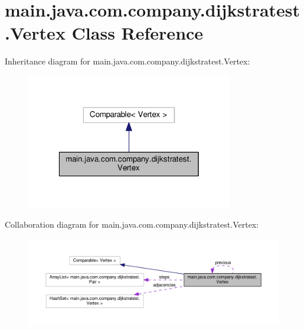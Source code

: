 \hypertarget{classmain_1_1java_1_1com_1_1company_1_1dijkstratest_1_1_vertex}{\section{main.\-java.\-com.\-company.\-dijkstratest.\-Vertex Class Reference}
\label{classmain_1_1java_1_1com_1_1company_1_1dijkstratest_1_1_vertex}
}


Inheritance diagram for main.\-java.\-com.\-company.\-dijkstratest.\-Vertex\-:
\nopagebreak
\begin{figure}[H]
\begin{center}
\leavevmode
\includegraphics[width=256pt]{classmain_1_1java_1_1com_1_1company_1_1dijkstratest_1_1_vertex__inherit__graph}
\end{center}
\end{figure}


Collaboration diagram for main.\-java.\-com.\-company.\-dijkstratest.\-Vertex\-:
\nopagebreak
\begin{figure}[H]
\begin{center}
\leavevmode
\includegraphics[width=350pt]{classmain_1_1java_1_1com_1_1company_1_1dijkstratest_1_1_vertex__coll__graph}
\end{center}
\end{figure}
